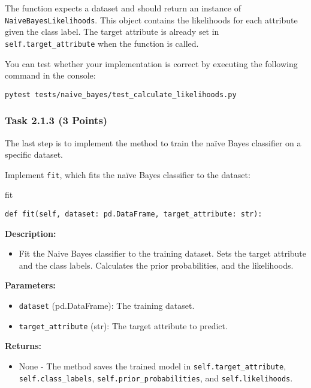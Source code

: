 \documentclass[
english,
smallborders
]{i6prcsht}
\newcommand{\points}[1]{\hfill \color{red}(#1 Points)\color{black}}
\begin{document}
\vspace*{0.5cm}

The function expects a dataset and should return an instance of \texttt{NaiveBayesLikelihoods}. This object contains the likelihoods for each attribute given the class label. The target attribute is already set in \texttt{self.target\_attribute} when the function is called.

You can test whether your implementation is correct by executing the following command in the console:

\vspace*{0.3cm}

\begin{lstlisting}
pytest tests/naive_bayes/test_calculate_likelihoods.py
\end{lstlisting}

\newpage

\subsubsection*{Task 2.1.3 \points{3}}

The last step is to implement the method to train the naïve Bayes classifier on a specific dataset.

Implement \texttt{fit}, which fits the naïve Bayes classifier to the dataset:

\vspace*{0.3cm}

\begin{functionbox}{fit}
	\begin{lstlisting}[numbers=none]
def fit(self, dataset: pd.DataFrame, target_attribute: str):
\end{lstlisting}
	
	\textbf{Description:}
	\begin{itemize}[leftmargin=*,topsep=0pt]
		\item Fit the Naive Bayes classifier to the training dataset. Sets the target attribute and the class labels. Calculates the prior probabilities, and the likelihoods.
	\end{itemize}
	
	\textbf{Parameters:}
	\begin{itemize}[leftmargin=*,topsep=0pt]
		\item \texttt{dataset} (pd.DataFrame): The training dataset.
		\item \texttt{target\_attribute} (str): The target attribute to predict.
	\end{itemize}
	
	\textbf{Returns:}
	\begin{itemize}[leftmargin=*,topsep=0pt]
		\item None - The method saves the trained model in \texttt{self.target\_attribute}, \texttt{self.class\_labels}, \texttt{self.prior\_probabilities}, and \texttt{self.likelihoods}.
	\end{itemize}
\end{functionbox}
\end{document}
